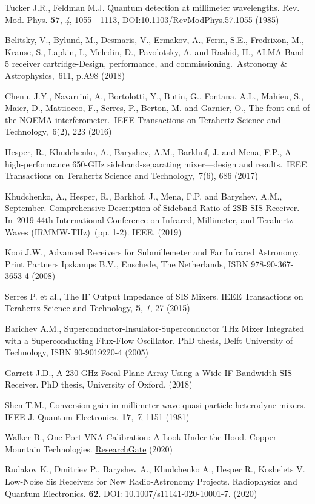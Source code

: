 \documentclass[a4paper]{article}
\begin{document}
\newpage
\begin{thebibliography}{12}

 Tucker J.R., Feldman M.J. Quantum detection at millimeter wavelengths. Rev. Mod. Phys. \textbf{57}, \textit{4}, 1055—1113, DOI:10.1103/RevModPhys.57.1055 (1985)

 Belitsky, V., Bylund, M., Desmaris, V., Ermakov, A., Ferm, S.E., Fredrixon, M., Krause, S., Lapkin, I., Meledin, D., Pavolotsky, A. and Rashid, H., ALMA Band 5 receiver cartridge-Design, performance, and commissioning. Astronomy \& Astrophysics, 611, p.A98 (2018)

 Chenu, J.Y., Navarrini, A., Bortolotti, Y., Butin, G., Fontana, A.L., Mahieu, S., Maier, D., Mattiocco, F., Serres, P., Berton, M. and Garnier, O., The front-end of the NOEMA interferometer. IEEE Transactions on Terahertz Science and Technology, 6(2), 223 (2016)

 Hesper, R., Khudchenko, A., Baryshev, A.M., Barkhof, J. and Mena, F.P., A high-performance 650-GHz sideband-separating mixer—design and results. IEEE Transactions on Terahertz Science and Technology, 7(6), 686 (2017)

 Khudchenko, A., Hesper, R., Barkhof, J., Mena, F.P. and Baryshev, A.M., September. Comprehensive Description of Sideband Ratio of 2SB SIS Receiver. In 2019 44th International Conference on Infrared, Millimeter, and Terahertz Waves (IRMMW-THz) (pp. 1-2). IEEE.  (2019)

 Kooi J.W., Advanced Receivers for Submillemeter and Far Infrared Astronomy. Print Partners Ipskamps B.V., Enschede, The Netherlands, ISBN 978-90-367-3653-4 (2008)

 Serres P. et al., The IF Output Impedance of SIS Mixers. IEEE Transactions on Terahertz Science and Technology, \textbf{5}, \textit{1}, 27 (2015)

 Barichev A.M., Superconductor-Insulator-Superconductor THz Mixer Integrated with a Superconducting Flux-Flow Oscillator. PhD thesis, Delft University of Technology, ISBN 90-9019220-4 (2005)

 Garrett J.D., A 230 GHz Focal Plane Array Using a Wide IF Bandwidth SIS Receiver. PhD thesis, University of Oxford, (2018)

 Shen T.M., Conversion gain in millimeter wave quasi-particle heterodyne mixers. IEEE J. Quantum Electronics, \textbf{17},  \textit{7}, 1151 (1981)

 Walker B., One-Port VNA Calibration: A Look Under the Hood. Copper Mountain Technologies. \href{https://www.researchgate.net/publication/349533253_One_Port_VNA_Calibration_a_look_under_the_hood}{ResearchGate} (2020)

 Rudakov K., Dmitriev P., Baryshev A., Khudchenko A., Hesper R., Koshelets V. Low-Noise Sis Receivers for New Radio-Astronomy Projects. Radiophysics and Quantum Electronics. \textbf{62}. DOI: 10.1007/s11141-020-10001-7. (2020)

\end{thebibliography}
\end{document}
